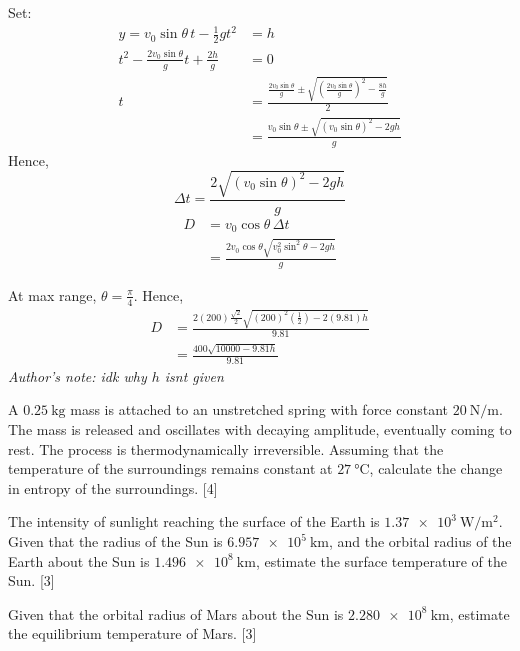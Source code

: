 \begin{solution}
    \begin{subsolution}
        Set:
        \begin{align*}
            y=v_0\sin \theta\,t-\frac{1}{2}gt^2&=h\\
            t^2-\frac{2v_0\sin \theta}{g}t+\frac{2h}{g}&=0\\
            t&=\frac{\frac{2v_0\sin \theta}{g}\pm\sqrt{\left(\frac{2v_0\sin \theta}{g}\right)^2-\frac{8h}{g}}}{2}\\
            &=\frac{v_0\sin \theta\pm\sqrt{\left(v_0\sin \theta\right)^2-2gh}}{g}
        \end{align*}
        Hence,
        \[\Delta t=\frac{2\sqrt{\left(v_0\sin \theta\right)^2-2gh}}{g}\]
        \begin{align*}
            D&=v_0\cos\theta\,\Delta t\\
            &=\boxed{\frac{2v_0\cos \theta\sqrt{v_0^2\sin^2\theta-2gh}}{g}}
        \end{align*}
    \end{subsolution}
    \tcblower
    \begin{subsolution}
        At max range, \(\theta=\frac{\pi}{4}\). Hence,
        \begin{align*}
            D&=\frac{2(200)\frac{\sqrt{2}}{2}\sqrt{(200)^2(\frac{1}{2})-2(9.81)h}}{9.81}\\
            &=\boxed{\frac{400\sqrt{10000-9.81h}}{9.81}}
        \end{align*}
        \textit{Author's note: idk why $h$ isnt given}
    \end{subsolution}
\end{solution}

\begin{problem}
    \begin{subproblem}
        A $\qty{0.25}{\kg}$ mass is attached to an unstretched spring with force constant $\qty{20}{\N\per\m}$. The mass is released and oscillates with decaying amplitude, eventually coming to rest. The process is thermodynamically irreversible. Assuming that the temperature of the surroundings remains constant at $\qty{27}{\degreeCelsius}$, calculate the change in entropy of the surroundings.
    \hfill{[4]}\end{subproblem}
    \begin{subproblem}
        The intensity of sunlight reaching the surface of the Earth is $\qty{1.37e3}{\W\per\square\m}$. Given that the radius of the Sun is $\qty{6.957e5}{\km}$, and the orbital radius of the Earth about the Sun is $\qty{1.496e8}{\km}$, estimate the surface temperature of the Sun.
    \hfill{[3]}\end{subproblem}
    \begin{subproblem}
        Given that the orbital radius of Mars about the Sun is $\qty{2.280e8}{\km}$, estimate the equilibrium temperature of Mars. 
    \hfill{[3]}\end{subproblem}
\end{problem}

